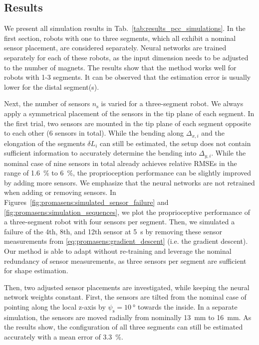 \subsection{Results}\label{sub:promasens:simulation_pcc_results}
We present all simulation results in Tab.~\ref{tab:results_pcc_simulations}.
In the first section, robots with one to three segments, which all exhibit a nominal sensor placement, are considered separately. Neural networks are trained separately for each of these robots, as the input dimension needs to be adjusted to the number of magnets.
The results show that the method works well for robots with 1-3 segments. It can be observed that the estimation error is usually lower for the distal segment(s).

Next, the number of sensors $n_\mathrm{s}$ is varied for a three-segment robot. We always apply a symmetrical placement of the sensors in the tip plane of each segment. In the first trial, two sensors are mounted in the tip plane of each segment opposite to each other (6 sensors in total). While the bending along $\Delta_{x,i}$ and the elongation of the segments $\delta L_i$ can still be estimated, the setup does not contain sufficient information to accurately determine the bending into $\Delta_{y,i}$.
While the nominal case of nine sensors in total already achieves relative RMSEs in the range of \SI{1.6}{\percent} to \SI{6}{\percent}, the proprioception performance can be slightly improved by adding more sensors.
We emphasize that the neural networks are not retrained when adding or removing sensors.
In Figures~\ref{fig:promasens:simulated_sensor_failure} and \ref{fig:promasens:simulation_sequences}, we plot the proprioceptive performance of a three-segment robot with four sensors per segment. Then, we simulated a failure of the 4th, 8th, and 12th sensor at \SI{5}{s} by removing these sensor measurements from \eqref{eq:promasens:gradient_descent} (i.e. the gradient descent). Our method is able to adapt without re-training and leverage the nominal redundancy of sensor measurements, as three sensors per segment are sufficient for shape estimation.

Then, two adjusted sensor placements are investigated, while keeping the neural network weights constant. First, the sensors are tilted from the nominal case of pointing along the local z-axis by $\psi_\mathrm{s} = \SI{10}{\degree}$ towards the inside. In a separate simulation, the sensors are moved radially from nominally \SI{13}{mm} to \SI{16}{mm}. As the results show, the configuration of all three segments can still be estimated accurately with a mean error of \SI{3.3}{\percent}.

